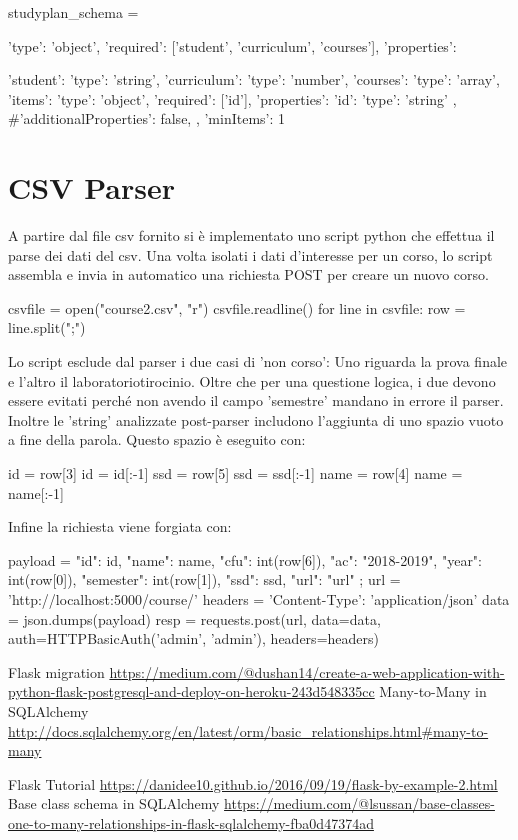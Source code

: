 \documentclass{article}
\begin{document}
\begin{python}
studyplan_schema = {
    'type': 'object',
    'required': ['student', 'curriculum', 'courses'],
    'properties': {
        'student': {'type': 'string'},
        'curriculum': {'type': 'number'},
        'courses': {
            'type': 'array',
            'items': {
                'type': 'object',
                'required': ['id'],
                'properties': {
                    'id': {'type': 'string'}
                },
                #'additionalProperties': false,
            },
            'minItems': 1
        }

    }
}
\end{python}
\newpage
\section{CSV Parser}
A partire dal file csv fornito si è implementato uno script python che effettua il parse dei dati del csv. Una volta isolati i dati d'interesse per un corso, lo script assembla e invia in automatico una richiesta POST per creare un nuovo corso.
\begin{python}[caption=Data parser]
csvfile = open("course2.csv", "r") 
csvfile.readline() 
for line in csvfile:
	row = line.split(";")
\end{python}
Lo script esclude dal parser i due casi di 'non corso': Uno riguarda la prova finale e l'altro il laboratorio\/tirocinio.
Oltre che per una questione logica, i due devono essere evitati perché non avendo il campo 'semestre' mandano in errore il parser.
Inoltre le 'string' analizzate post-parser includono l'aggiunta di uno spazio vuoto a fine della parola. Questo spazio è eseguito con:
\begin{python}[caption=String manupulation]
		id = row[3]
		id = id[:-1]
		ssd = row[5]
		ssd = ssd[:-1]
		name = row[4]
		name = name[:-1]
\end{python}
Infine la richiesta viene forgiata con:
\begin{python}[caption = send JSON POST req]
payload = {
	"id": id,
	"name": name,
	"cfu": int(row[6]), 
	"ac": "2018-2019", 
	"year": int(row[0]), 
	"semester": int(row[1]), 
	"ssd": ssd, 
	"url": "url"
};
url = 'http://localhost:5000/course/'
headers = {'Content-Type': 'application/json'}
data = json.dumps(payload)
resp = requests.post(url, data=data, auth=HTTPBasicAuth('admin', 'admin'), headers=headers)
\end{python}
\newpage
\begin{thebibliography}{Bibliografia}
  Flask migration \url{https://medium.com/@dushan14/create-a-web-application-with-python-flask-postgresql-and-deploy-on-heroku-243d548335cc}
  Many-to-Many in SQLAlchemy  \url{http://docs.sqlalchemy.org/en/latest/orm/basic_relationships.html#many-to-many}

  Flask Tutorial \url{https://danidee10.github.io/2016/09/19/flask-by-example-2.html}
  Base class schema in SQLAlchemy \url{https://medium.com/@lsussan/base-classes-one-to-many-relationships-in-flask-sqlalchemy-fba0d47374ad}
\end{thebibliography}
\end{document}
